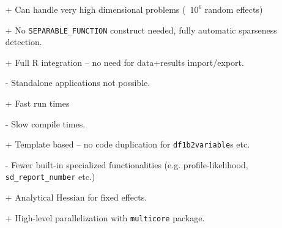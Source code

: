 \documentclass[compress]{beamer}
\begin{document}
\begin{frame}
  \begin{itemize}
    \item[+] Can handle very high dimensional problems (~$10^6$ random effects)
    \item[+] No \texttt{SEPARABLE\_FUNCTION} construct needed, fully automatic sparseness detection.
    \item[+] Full R integration -- no need for data+results import/export.
    \item[-] Standalone applications not possible.
    \item[+] Fast run times
    \item[-] Slow compile times.
    \item[+] Template based -- no code duplication for \texttt{df1b2variable}s etc.
    \item[-] Fewer built-in specialized functionalities (e.g. profile-likelihood, \texttt{sd\_report\_number} etc.)
    \item[+] Analytical Hessian for fixed effects.
    \item[+] High-level parallelization with \texttt{multicore} package. 
  \end{itemize}
\end{frame}
\end{document}
